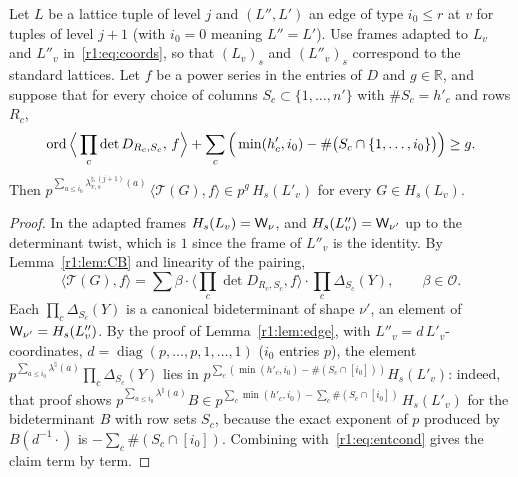 \begin{theorem}\label{r1:thm:ent-even}
Let $L$ be a lattice tuple of level $j$ and $(L'',L')$ an edge of type $i_0\le r$ at $v$ for tuples of level $j+1$ (with $i_0=0$ meaning $L''=L'$). Use frames adapted to $L_v$ and $L''_v$ in~\eqref{r1:eq:coords}, so that $(L_v)_s$ and $(L''_v)_s$ correspond to the standard lattices. Let $f$ be a power series in the entries of $D$ and $g\in\mathbb R$, and suppose that for every choice of columns $S_c\subset\{1,\dots,n'\}$ with $\#S_c=h'_c$ and rows $R_c$,
\begin{equation}\label{r1:eq:entcond}
\operatorname{ord}\Big\langle\prod_c\det D_{R_c,S_c},\,f\Big\rangle+\sum_c\Big(\min(h'_c,i_0)-\#\big(S_c\cap\{1,\dots,i_0\}\big)\Big)\ge g .
\end{equation}
Then $p^{\sum_{a\le i_0}\lambda^{\natural,(j+1)}_{v,s}(a)}\,\langle\mathcal T(G),f\rangle\in p^g\,H_s(L'_v)$ for every $G\in H_s(L_v)$.
\end{theorem}

\begin{proof}
In the adapted frames $H_s(L_v)=\mathsf W_\nu$, and $H_s(L''_v)=\mathsf W_{\nu'}$ up to the determinant twist, which is $1$ since the frame of $L''_v$ is the identity. By Lemma~\ref{r1:lem:CB} and linearity of the pairing,
\[
\langle\mathcal T(G),f\rangle=\sum\beta\cdot\Big\langle\prod_c\det D_{R_c,S_c},f\Big\rangle\cdot\prod_c\Delta_{S_c}(Y),\qquad\beta\in\mathcal O .
\]
Each $\prod_c\Delta_{S_c}(Y)$ is a canonical bideterminant of shape $\nu'$, an element of $\mathsf W_{\nu'}=H_s(L''_v)$. By the proof of Lemma~\ref{r1:lem:edge}, with $L''_v=d\,L'_v$-coordinates, $d=\operatorname{diag}(p,\dots,p,1,\dots,1)$ ($i_0$ entries $p$), the element $p^{\sum_{a\le i_0}\lambda^\natural(a)}\prod_c\Delta_{S_c}(Y)$ lies in $p^{\sum_c(\min(h'_c,i_0)-\#(S_c\cap[i_0]))}H_s(L'_v)$: indeed, that proof shows $p^{\sum_{a\le i_0}\lambda^\natural(a)}B\in p^{\sum_c\min(h'_c,i_0)-\sum_c\#(S_c\cap[i_0])}\,H_s(L'_v)$ for the bideterminant $B$ with row sets $S_c$, because the exact exponent of $p$ produced by $B(d^{-1}\cdot)$ is $-\sum_c\#(S_c\cap[i_0])$. Combining with~\eqref{r1:eq:entcond} gives the claim term by term.
\end{proof}

